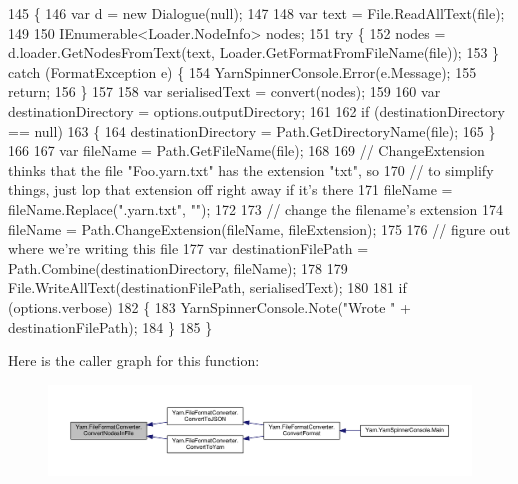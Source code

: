 \begin{DoxyCode}
145         \{
146             var d = \textcolor{keyword}{new} Dialogue(null);
147 
148             var text = File.ReadAllText(file);
149 
150             IEnumerable<Loader.NodeInfo> nodes;
151             \textcolor{keywordflow}{try} \{
152                 nodes = d.loader.GetNodesFromText(text, Loader.GetFormatFromFileName(file));
153             \} \textcolor{keywordflow}{catch} (FormatException e) \{
154                 YarnSpinnerConsole.Error(e.Message);
155                 \textcolor{keywordflow}{return};
156             \}
157 
158             var serialisedText = convert(nodes);
159 
160             var destinationDirectory = options.outputDirectory;
161 
162             \textcolor{keywordflow}{if} (destinationDirectory == null)
163             \{
164                 destinationDirectory = Path.GetDirectoryName(file);
165             \}
166 
167             var fileName = Path.GetFileName(file);
168 
169             \textcolor{comment}{// ChangeExtension thinks that the file "Foo.yarn.txt" has the extension "txt", so}
170             \textcolor{comment}{// to simplify things, just lop that extension off right away if it's there}
171             fileName = fileName.Replace(\textcolor{stringliteral}{".yarn.txt"}, \textcolor{stringliteral}{""});
172 
173             \textcolor{comment}{// change the filename's extension}
174             fileName = Path.ChangeExtension(fileName, fileExtension);
175 
176             \textcolor{comment}{// figure out where we're writing this file}
177             var destinationFilePath = Path.Combine(destinationDirectory, fileName);
178 
179             File.WriteAllText(destinationFilePath, serialisedText);
180 
181             \textcolor{keywordflow}{if} (options.verbose)
182             \{
183                 YarnSpinnerConsole.Note(\textcolor{stringliteral}{"Wrote "} + destinationFilePath);
184             \}
185         \}
\end{DoxyCode}


Here is the caller graph for this function\-:
\nopagebreak
\begin{figure}[H]
\begin{center}
\leavevmode
\includegraphics[width=350pt]{a00105_aa72838be584177b5592c31d73c0febdb_icgraph}
\end{center}
\end{figure}


